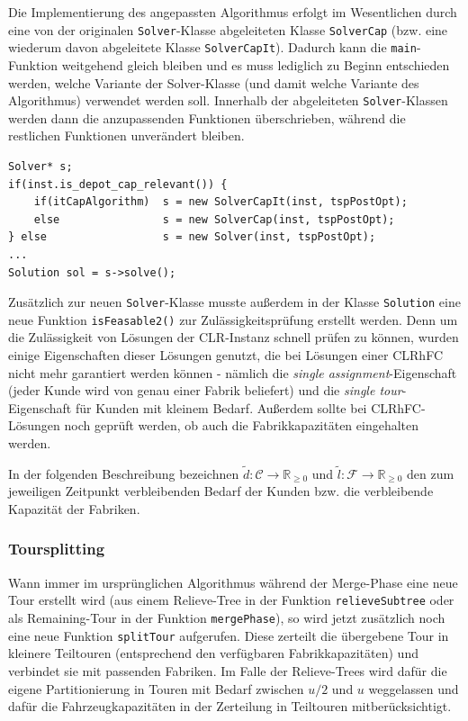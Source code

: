\documentclass[a4paper,ngerman,11pt,bibtotoc]{scrartcl}
\theoremstyle{definition}
\theoremstyle{plain}
\theoremstyle{remark}
\newcommand{\IR}{\mathbb{R}}
\newcommand{\ClientSet}{\mathscr{C}}
\newcommand{\FacilitySet}{\mathscr{F}}
\newcommand{\CLR}{CLR}
\newcommand{\CLRHFC}{CLRhFC}
\begin{document}
	Die Implementierung des angepassten Algorithmus erfolgt im Wesentlichen durch eine von der originalen \lstinline|Solver|-Klasse abgeleiteten Klasse \lstinline|SolverCap| (bzw. eine wiederum davon abgeleitete Klasse \lstinline|SolverCapIt|). Dadurch kann die \lstinline|main|-Funktion weitgehend gleich bleiben und es muss lediglich zu Beginn entschieden werden, welche Variante der Solver-Klasse (und damit welche Variante des Algorithmus) verwendet werden soll. Innerhalb der abgeleiteten \lstinline|Solver|-Klassen werden dann die anzupassenden Funktionen überschrieben, während die restlichen Funktionen unverändert bleiben.
	
	\begin{lstlisting}[caption=Der weitere Ablauf des Programms kann unabhängig von der verwendeten Version des Solvers beschrieben werden]
Solver* s;
if(inst.is_depot_cap_relevant()) {
	if(itCapAlgorithm) 	s = new SolverCapIt(inst, tspPostOpt);
	else 				s = new SolverCap(inst, tspPostOpt);
} else 					s = new Solver(inst, tspPostOpt);
...
Solution sol = s->solve();
	\end{lstlisting}
	
	Zusätzlich zur neuen \lstinline|Solver|-Klasse musste außerdem in der Klasse \lstinline|Solution| eine neue Funktion  \lstinline|isFeasable2()| zur Zulässigkeitsprüfung erstellt werden. Denn um die Zulässigkeit von Lösungen der \CLR-Instanz schnell prüfen zu können, wurden einige Eigenschaften dieser Lösungen genutzt, die bei Lösungen einer \CLRHFC{} nicht mehr garantiert werden können - nämlich die \emph{single assignment}-Eigenschaft (jeder Kunde wird von genau einer Fabrik beliefert) und die \emph{single tour}-Eigenschaft für Kunden mit kleinem Bedarf. Außerdem sollte bei \CLRHFC-Lösungen noch geprüft werden, ob auch die Fabrikkapazitäten eingehalten werden.
	
	In der folgenden Beschreibung bezeichnen $\tilde{d}: \ClientSet \to \IR_{\geq 0}$ und $\tilde{l}: \FacilitySet \to \IR_{\geq 0}$ den zum jeweiligen Zeitpunkt verbleibenden Bedarf der Kunden bzw. die verbleibende Kapazität der Fabriken.
	

	\subsubsection{Toursplitting}
	
	Wann immer im ursprünglichen Algorithmus während der Merge-Phase eine neue Tour erstellt wird (aus einem Relieve-Tree in der Funktion \lstinline|relieveSubtree| oder als Remaining-Tour in der Funktion \lstinline|mergePhase|), so wird jetzt zusätzlich noch eine neue Funktion \lstinline|splitTour| aufgerufen. Diese zerteilt die übergebene Tour in kleinere Teiltouren (entsprechend den verfügbaren Fabrikkapazitäten) und verbindet sie mit passenden Fabriken. Im Falle der Relieve-Trees wird dafür die eigene Partitionierung in Touren mit Bedarf zwischen $u/2$ und $u$ weggelassen und dafür die Fahrzeugkapazitäten in der Zerteilung in Teiltouren mitberücksichtigt.
	
\end{document}
